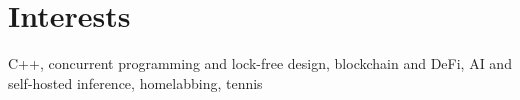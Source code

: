 \section{Interests}
 \begin{itemize}[leftmargin=0.15in, label={}]
    \small{\item{
     C++, concurrent programming and lock-free design, blockchain and DeFi, AI and self-hosted inference, homelabbing, tennis
    }}
 \end{itemize}
